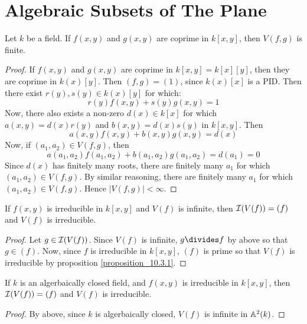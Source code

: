 \section{Algebraic Subsets of The Plane}\label{section_10.6}

\begin{proposition}\label{proposition_10.4.1}
  Let $k$ be a field. If $f(x,y)$ and $g(x,y)$ are coprime in
  $k[x,y]$, then $V(f,g)$ is finite.
\end{proposition}
\begin{proof}
  If $f(x,y)$ and $g(x,y)$ are coprime in $k[x,y]=k[x][y]$, then
  they are coprime in $k(x)[y]$. Then $(f,g)=(1)$, since $k(x)[x]$ is
  a PID. Then there exist $r(y),s(y) \in k(x)[y]$ for which:
  \begin{equation*}
    r(y)f(x,y)+s(y)g(x,y)=1
  \end{equation*}
  Now, there also exists a non-zero $d(x) \in k[x]$ for which
  $a(x,y)=d(x)r(y)$ and $b(x,y)=d(x)s(y)$ in $k[x,y]$. Then
  \begin{equation*}
    a(x,y)f(x,y)+b(x,y)g(x,y)=d(x)
  \end{equation*}
  Now, if $(a_1,a_2) \in V(f,g)$, then
  \begin{equation*}
    a(a_1,a_2)f(a_1,a_2)+b(a_1,a_2)g(a_1,a_2)=d(a_1)=0
  \end{equation*}
  Since $d(x)$ has finitely many roots, there are finitely many $a_1$
  for which $(a_1,a_2) \in V(f,g)$. By similar reasoning, there are
  finitely many $a_1$ for which $(a_1,a_2) \in V(f,g)$. Hence
  $|V(f,g)|<\infty$.
\end{proof}
\begin{corollary}
  If $f(x,y)$ is irreducible in $k[x,y]$ and $V(f)$ is infinite, then
  $\mathcal{I}(V(f))=(f)$ and $V(f)$ is irreducible.
\end{corollary}
\begin{proof}
  Let $g \in \mathcal{I}(V(f))$. Since $V(f)$ is infinite, $g \divides f$ by
  above so that $g \in (f)$. Now, since $f$ is irreducible in
  $k[x,y]$, $(f)$ is prime so that $V(f)$ is irreducible by
  proposition \ref{proposition_10.3.1}.
\end{proof}
\begin{corollary}
  If $k$ is an algerbaically closed field, and $f(x,y)$ is irreducible
  in $k[x,y]$, then $\mathcal{I}(V(f))=(f)$ and $V(f)$ is irreducible.
\end{corollary}
\begin{proof}
  By above, since $k$ is algerbaically closed, $V(f)$ is infinite in
  $\mathbb{A}^2(k)$.
\end{proof}
